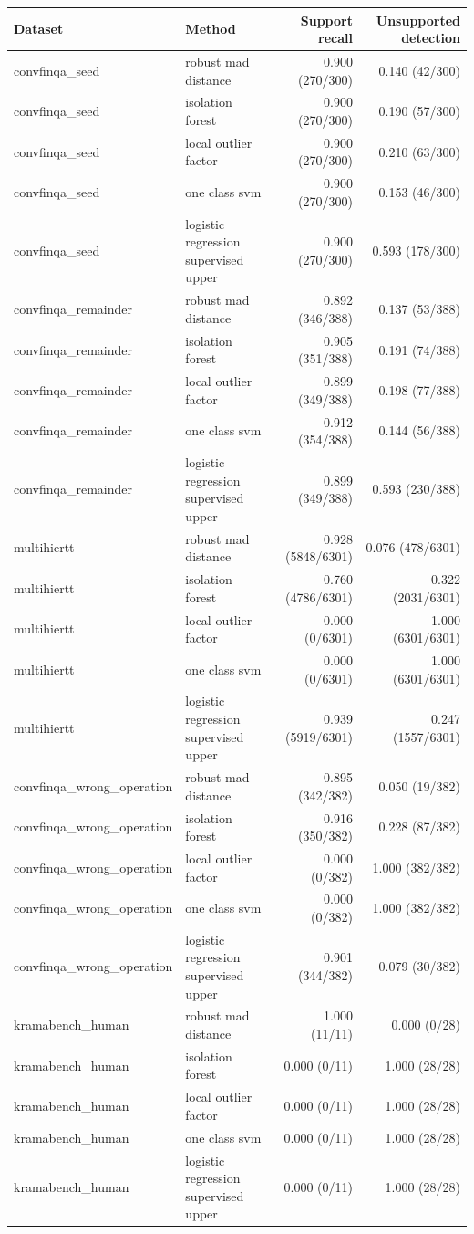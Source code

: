 \begin{tabular}{llrr}
\toprule
Dataset & Method & Support recall & Unsupported detection \\
\midrule
convfinqa_seed & robust mad distance & 0.900 (270/300) & 0.140 (42/300) \\
convfinqa_seed & isolation forest & 0.900 (270/300) & 0.190 (57/300) \\
convfinqa_seed & local outlier factor & 0.900 (270/300) & 0.210 (63/300) \\
convfinqa_seed & one class svm & 0.900 (270/300) & 0.153 (46/300) \\
convfinqa_seed & logistic regression supervised upper & 0.900 (270/300) & 0.593 (178/300) \\
convfinqa_remainder & robust mad distance & 0.892 (346/388) & 0.137 (53/388) \\
convfinqa_remainder & isolation forest & 0.905 (351/388) & 0.191 (74/388) \\
convfinqa_remainder & local outlier factor & 0.899 (349/388) & 0.198 (77/388) \\
convfinqa_remainder & one class svm & 0.912 (354/388) & 0.144 (56/388) \\
convfinqa_remainder & logistic regression supervised upper & 0.899 (349/388) & 0.593 (230/388) \\
multihiertt & robust mad distance & 0.928 (5848/6301) & 0.076 (478/6301) \\
multihiertt & isolation forest & 0.760 (4786/6301) & 0.322 (2031/6301) \\
multihiertt & local outlier factor & 0.000 (0/6301) & 1.000 (6301/6301) \\
multihiertt & one class svm & 0.000 (0/6301) & 1.000 (6301/6301) \\
multihiertt & logistic regression supervised upper & 0.939 (5919/6301) & 0.247 (1557/6301) \\
convfinqa_wrong_operation & robust mad distance & 0.895 (342/382) & 0.050 (19/382) \\
convfinqa_wrong_operation & isolation forest & 0.916 (350/382) & 0.228 (87/382) \\
convfinqa_wrong_operation & local outlier factor & 0.000 (0/382) & 1.000 (382/382) \\
convfinqa_wrong_operation & one class svm & 0.000 (0/382) & 1.000 (382/382) \\
convfinqa_wrong_operation & logistic regression supervised upper & 0.901 (344/382) & 0.079 (30/382) \\
kramabench_human & robust mad distance & 1.000 (11/11) & 0.000 (0/28) \\
kramabench_human & isolation forest & 0.000 (0/11) & 1.000 (28/28) \\
kramabench_human & local outlier factor & 0.000 (0/11) & 1.000 (28/28) \\
kramabench_human & one class svm & 0.000 (0/11) & 1.000 (28/28) \\
kramabench_human & logistic regression supervised upper & 0.000 (0/11) & 1.000 (28/28) \\
\bottomrule
\end{tabular}

